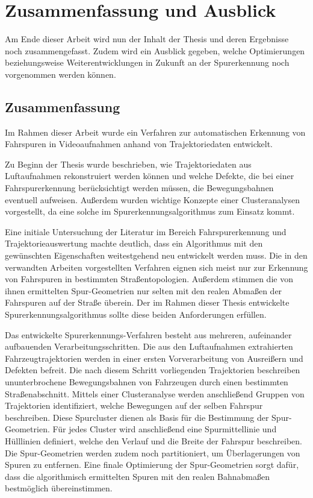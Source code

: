 
\chapter{Zusammenfassung und Ausblick}
\label{cha:end}

Am Ende dieser Arbeit wird nun der Inhalt der Thesis und deren Ergebnisse noch
zusammengefasst. Zudem wird ein Ausblick gegeben, welche Optimierungen beziehungsweise
Weiterentwicklungen in Zukunft an der Spurerkennung noch vorgenommen werden können.

\section{Zusammenfassung}

Im Rahmen dieser Arbeit wurde ein Verfahren zur automatischen Erkennung von Fahrspuren in Videoaufnahmen
anhand von Trajektoriedaten entwickelt.

Zu Beginn der Thesis wurde beschrieben, wie Trajektoriedaten aus Luftaufnahmen rekonstruiert werden können
und welche Defekte, die bei einer Fahrspurerkennung berücksichtigt werden müssen, die Bewegungsbahnen eventuell aufweisen.
Außerdem wurden wichtige Konzepte einer Clusteranalysen vorgestellt, da eine solche im Spurerkennungsalgorithmus
zum Einsatz kommt.

Eine initiale Untersuchung der Literatur im Bereich Fahrspurerkennung und Trajektorieauswertung
machte deutlich, dass ein Algorithmus mit den gewünschten Eigenschaften weitestgehend neu entwickelt werden muss.
Die in den verwandten Arbeiten vorgestellten Verfahren eignen sich meist nur zur Erkennung von Fahrspuren
in bestimmten Straßentopologien. Außerdem stimmen die von ihnen ermittelten Spur-Geometrien nur selten
mit den realen Abmaßen der Fahrspuren auf der Straße überein.
Der im Rahmen dieser Thesis entwickelte Spurerkennungsalgorithmus sollte diese beiden Anforderungen erfüllen.

Das entwickelte Spurerkennungs-Verfahren besteht aus mehreren, aufeinander aufbauenden Verarbeitungsschritten. Die aus den
Luftaufnahmen extrahierten Fahrzeugtrajektorien werden in einer ersten Vorverarbeitung von
Ausreißern und Defekten befreit. Die nach diesem Schritt vorliegenden Trajektorien beschreiben
ununterbrochene Bewegungsbahnen von Fahrzeugen durch einen bestimmten Straßenabschnitt.
Mittels einer Clusteranalyse werden anschließend Gruppen von Trajektorien identifiziert, welche Bewegungen
auf der selben Fahrspur beschreiben.
Diese Spurcluster dienen als Basis für die Bestimmung der Spur-Geometrien. Für jedes Cluster wird anschließend eine
Spurmittellinie und Hülllinien definiert, welche den Verlauf und die Breite der Fahrspur beschreiben.
Die Spur-Geometrien werden zudem noch partitioniert, um Überlagerungen von Spuren zu entfernen.
Eine finale Optimierung der Spur-Geometrien sorgt dafür, dass die algorithmisch ermittelten Spuren
mit den realen Bahnabmaßen bestmöglich übereinstimmen. 

